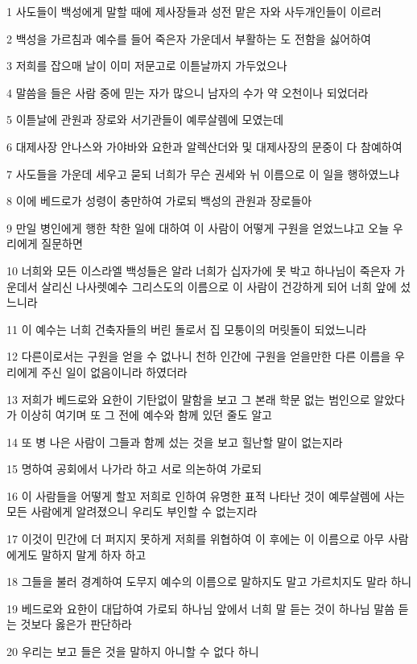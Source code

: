 \par 1 사도들이 백성에게 말할 때에 제사장들과 성전 맡은 자와 사두개인들이 이르러
\par 2 백성을 가르침과 예수를 들어 죽은자 가운데서 부활하는 도 전함을 싫어하여
\par 3 저희를 잡으매 날이 이미 저문고로 이튿날까지 가두었으나
\par 4 말씀을 들은 사람 중에 믿는 자가 많으니 남자의 수가 약 오천이나 되었더라
\par 5 이튿날에 관원과 장로와 서기관들이 예루살렘에 모였는데
\par 6 대제사장 안나스와 가야바와 요한과 알렉산더와 및 대제사장의 문중이 다 참예하여
\par 7 사도들을 가운데 세우고 묻되 너희가 무슨 권세와 뉘 이름으로 이 일을 행하였느냐
\par 8 이에 베드로가 성령이 충만하여 가로되 백성의 관원과 장로들아
\par 9 만일 병인에게 행한 착한 일에 대하여 이 사람이 어떻게 구원을 얻었느냐고 오늘 우리에게 질문하면
\par 10 너희와 모든 이스라엘 백성들은 알라 너희가 십자가에 못 박고 하나님이 죽은자 가운데서 살리신 나사렛예수 그리스도의 이름으로 이 사람이 건강하게 되어 너희 앞에 섰느니라
\par 11 이 예수는 너희 건축자들의 버린 돌로서 집 모퉁이의 머릿돌이 되었느니라
\par 12 다른이로서는 구원을 얻을 수 없나니 천하 인간에 구원을 얻을만한 다른 이름을 우리에게 주신 일이 없음이니라 하였더라
\par 13 저희가 베드로와 요한이 기탄없이 말함을 보고 그 본래 학문 없는 범인으로 알았다가 이상히 여기며 또 그 전에 예수와 함께 있던 줄도 알고
\par 14 또 병 나은 사람이 그들과 함께 섰는 것을 보고 힐난할 말이 없는지라
\par 15 명하여 공회에서 나가라 하고 서로 의논하여 가로되
\par 16 이 사람들을 어떻게 할꼬 저희로 인하여 유명한 표적 나타난 것이 예루살렘에 사는 모든 사람에게 알려졌으니 우리도 부인할 수 없는지라
\par 17 이것이 민간에 더 퍼지지 못하게 저희를 위협하여 이 후에는 이 이름으로 아무 사람에게도 말하지 말게 하자 하고
\par 18 그들을 불러 경계하여 도무지 예수의 이름으로 말하지도 말고 가르치지도 말라 하니
\par 19 베드로와 요한이 대답하여 가로되 하나님 앞에서 너희 말 듣는 것이 하나님 말씀 듣는 것보다 옳은가 판단하라
\par 20 우리는 보고 들은 것을 말하지 아니할 수 없다 하니
